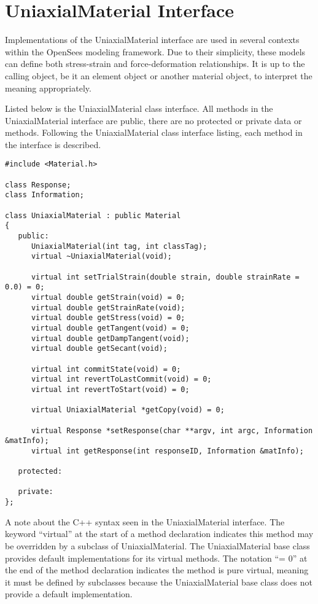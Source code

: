 \documentclass[12pt]{article}
\begin{document}
\section{UniaxialMaterial Interface}
Implementations of the UniaxialMaterial interface are used in several contexts within
the OpenSees modeling framework. Due to their simplicity, these models can define both
stress-strain and force-deformation relationships. It is up to the calling object, be
it an element object or another material object, to interpret the meaning appropriately.

Listed below is the UniaxialMaterial class interface.
All methods in the UniaxialMaterial interface are public, there are no protected or
private data or methods.
Following the UniaxialMaterial class interface listing, each method in the interface is
described.

{\sf\small
\begin{verbatim}
#include <Material.h>

class Response;
class Information;

class UniaxialMaterial : public Material
{
   public:
      UniaxialMaterial(int tag, int classTag);    
      virtual ~UniaxialMaterial(void);

      virtual int setTrialStrain(double strain, double strainRate = 0.0) = 0;
      virtual double getStrain(void) = 0;
      virtual double getStrainRate(void);
      virtual double getStress(void) = 0;
      virtual double getTangent(void) = 0;
      virtual double getDampTangent(void);
      virtual double getSecant(void);

      virtual int commitState(void) = 0;
      virtual int revertToLastCommit(void) = 0;    
      virtual int revertToStart(void) = 0;        

      virtual UniaxialMaterial *getCopy(void) = 0;

      virtual Response *setResponse(char **argv, int argc, Information &matInfo);
      virtual int getResponse(int responseID, Information &matInfo);    

   protected:
    
   private:
};
\end{verbatim}
}

A note about the C++ syntax seen in the UniaxialMaterial interface. The keyword
``virtual'' at the start of a method declaration indicates this method may be
overridden by a subclass of UniaxialMaterial. The UniaxialMaterial base class
provides default implementations for its virtual methods. The notation ``= 0'' at the end of
the method declaration indicates the method is \p pure virtual, meaning it
\p must be defined by subclasses because the UniaxialMaterial base class does
not provide a default implementation.
\end{document}
